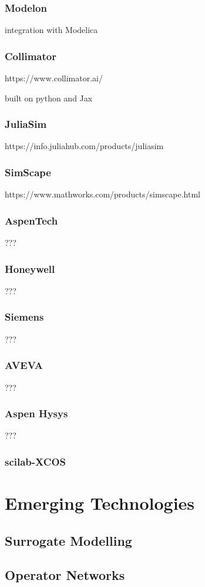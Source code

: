 \subsubsection{Modelon}
integration with Modelica 

\subsubsection{Collimator}
https://www.collimator.ai/


built on python and Jax

\subsubsection{JuliaSim}
https://info.juliahub.com/products/juliasim


\subsubsection{SimScape}
https://www.mathworks.com/products/simscape.html

\subsubsection{AspenTech} ???

\subsubsection{Honeywell} ???

\subsubsection{Siemens} ???

\subsubsection{AVEVA} ???

\subsubsection{Aspen Hysys} ???

\subsubsection{scilab-XCOS}



\section{Emerging Technologies }




\subsection{Surrogate Modelling}

\subsection{Operator Networks}



